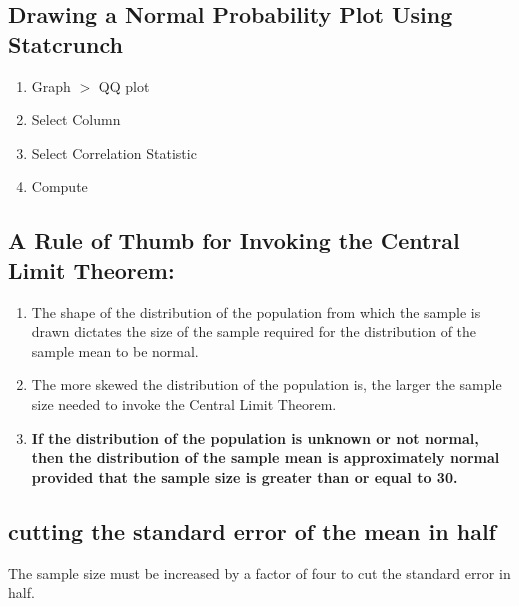 \documentclass{report}
\begin{document}
  \bigbreak \noindent \bigbreak \noindent 
  \subsection*{Drawing a Normal Probability Plot Using Statcrunch}
    \bigbreak \noindent 
    \begin{enumerate}
        \item Graph $> $ QQ plot
        \item Select Column
        \item Select Correlation Statistic
        \item Compute
    \end{enumerate}
    \bigbreak \noindent 
    \bigbreak \noindent 

    \pagebreak 
    \subsection*{A Rule of Thumb for Invoking the Central Limit Theorem:}
    \bigbreak \noindent 
         \begin{enumerate}
         \item The shape of the distribution of the population from which the sample is drawn dictates the size of the sample required for the distribution of the sample mean to be normal.
         \item The more skewed the distribution of the population is, the larger the sample size needed to invoke the Central Limit Theorem.
        \item \textbf{If the distribution of the population is unknown or not normal, then the distribution of the sample mean is approximately normal provided that the sample size is greater than or equal to 30.}
     \end{enumerate}

     \bigbreak \noindent \bigbreak \noindent 
     \subsection*{cutting the standard error of the mean in​ half}
     \bigbreak \noindent 
     The sample size must be increased by a factor of four to cut the standard error in half.
\end{document}
